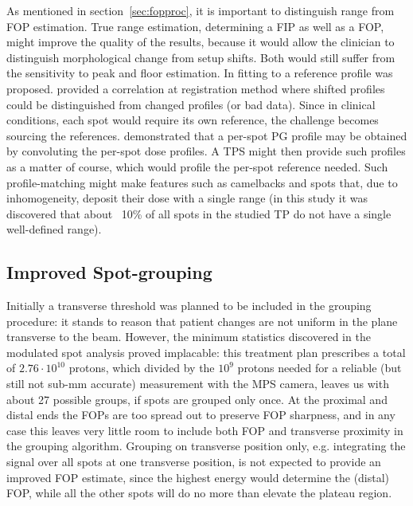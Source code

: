 \documentclass[a4paper,english]{article}
\begin{document}
As mentioned in section~\ref{sec:fopproc}, it is important to distinguish range from FOP estimation. True range estimation, determining a FIP as well as a FOP, might improve the quality of the results, because it would allow the clinician to distinguish morphological change from setup shifts. Both would still suffer from the sensitivity to peak and floor estimation. In \cite{Roellinghoff2014a} fitting to a reference profile was proposed. \cite{Gueth2013} provided a correlation at registration method where shifted profiles could be distinguished from changed profiles (or bad data). Since in clinical conditions, each spot would require its own reference, the challenge becomes sourcing the references. \cite{Schumann2016} demonstrated that a per-spot PG profile may be obtained by convoluting the per-spot dose profiles. A TPS might then provide such profiles as a matter of course, which would profile the per-spot reference needed. Such profile-matching might make features such as camelbacks and spots that, due to inhomogeneity, deposit their dose with a single range (in this study it was discovered that about ~10\% of all spots in the studied TP do not have a single well-defined range).

\subsection{Improved Spot-grouping}

Initially a transverse threshold was planned to be included in the grouping procedure: it stands to reason that patient changes are not uniform in the plane transverse to the beam. However, the minimum statistics discovered in the modulated spot analysis proved implacable: this treatment plan prescribes a total of $2.76\cdot10^{10}$ protons, which divided by the $10^9$ protons needed for a reliable (but still not sub-mm accurate) measurement with the MPS camera, leaves us with about 27 possible groups, if spots are grouped only once. At the proximal and distal ends the FOPs are too spread out to preserve FOP sharpness, and in any case this leaves very little room to include both FOP and transverse proximity in the grouping algorithm. Grouping on transverse position only, e.g. integrating the signal over all spots at one transverse position, is not expected to provide an improved FOP estimate, since the highest energy would determine the (distal) FOP, while all the other spots will do no more than elevate the plateau region.
\end{document}
